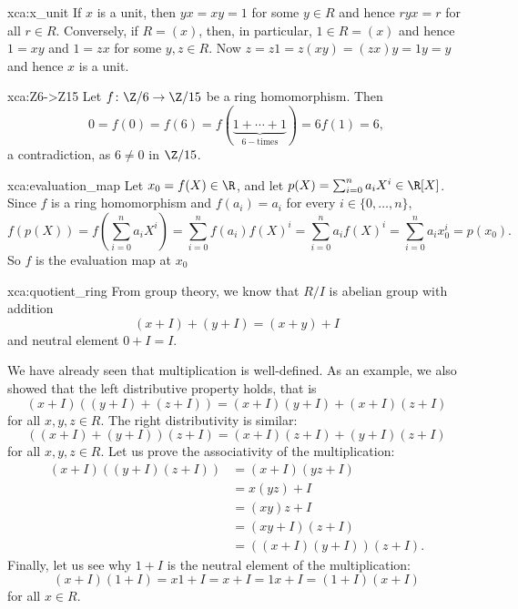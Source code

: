 \begin{sol}{xca:x_unit}
If $x$ is a unit, then $yx=xy=1$ for some $y\in R$ and hence $ryx=r$ for all $r\in R$. Conversely, 
if $R=(x)$, then, in particular, $1\in R=(x)$ and hence $1=xy$ and $1=zx$ for some $y,z\in R$. Now
$z=z1=z(xy)=(zx)y=1y=y$ and hence $x$ is a unit. 
\end{sol}

\begin{sol}{xca:Z6->Z15}
    Let $f\colon\Z/6\to\Z/15$ be a ring homomorphism. Then 
    \[
    0=f(0)=f(6)=f(\underbrace{1+\cdots+1}_{6-\text{times}})=6f(1)=6,
    \]
    a contradiction, as $6\ne 0$ in $\Z/15$. 
\end{sol}

\begin{sol}{xca:evaluation_map}
    Let $x_0=f(X)\in \R$, and let $p(X)=\sum_{i=0}^n a_iX^i\in \R[X]$.
    Since $f$ is a ring homomorphism and $f(a_i)=a_i$ for every $i\in\{0,\dots, n\}$,
    \[
    f(p(X))
    =f\left(\sum_{i=0}^n a_iX^i\right)
    =\sum_{i=0}^n f(a_i)f(X)^i
    =\sum_{i=0}^n a_if(X)^i
    =\sum_{i=0}^n a_ix_0^i
    =p(x_0).
    \]
    So $f$ is the evaluation map at $x_0$
\end{sol}

\begin{sol}{xca:quotient_ring}
From group theory, we know that $R/I$ is abelian group with addition 
\[
    (x+I)+(y+I)=(x+y)+I
\]
and neutral element $0+I=I$. 

We have already seen that multiplication is well-defined. 
As an example, we also showed that 
the left distributive property holds, that is 
\[
 (x+I)\left((y+I)+(z+I)\right)=(x+I)(y+I)+(x+I)(z+I)
\]
for all $x,y,z\in R$. The right distributivity is similar: 
\[
 \left((x+I)+(y+I)\right)(z+I)=(x+I)(z+I)+(y+I)(z+I)
\]
for all $x,y,z\in R$. 
Let us prove the associativity of the
multiplication: 
\begin{align*}
    (x+I)\left((y+I)(z+I)\right) &= (x+I)(yz+I)\\
    &=x(yz)+I\\
    &=(xy)z+I\\
    &=(xy+I)(z+I)\\
    &=\left((x+I)(y+I)\right)(z+I).
\end{align*}
Finally, let us see why $1+I$ is the neutral element of the multiplication:
\[
(x+I)(1+I)=x1+I=x+I=1x+I=(1+I)(x+I)
\]
for all $x\in R$. 
\end{sol}

